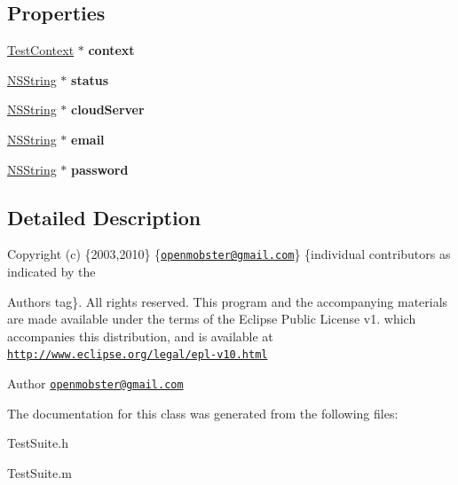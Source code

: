 \subsection*{\-Properties}
\begin{DoxyCompactItemize}
\item 
\hypertarget{interface_test_suite_a1852d1ae3801301dbcdf5324e276474a}{
\hyperlink{interface_test_context}{\-Test\-Context} $\ast$ {\bfseries context}}
\label{interface_test_suite_a1852d1ae3801301dbcdf5324e276474a}

\item 
\hypertarget{interface_test_suite_aa55bc04e8394fa1860e92e098b858c40}{
\hyperlink{class_n_s_string}{\-N\-S\-String} $\ast$ {\bfseries status}}
\label{interface_test_suite_aa55bc04e8394fa1860e92e098b858c40}

\item 
\hypertarget{interface_test_suite_aee65c3c5003d0da11b95cf653cc19756}{
\hyperlink{class_n_s_string}{\-N\-S\-String} $\ast$ {\bfseries cloud\-Server}}
\label{interface_test_suite_aee65c3c5003d0da11b95cf653cc19756}

\item 
\hypertarget{interface_test_suite_aa962f8c847eab597c3b920ccadad864b}{
\hyperlink{class_n_s_string}{\-N\-S\-String} $\ast$ {\bfseries email}}
\label{interface_test_suite_aa962f8c847eab597c3b920ccadad864b}

\item 
\hypertarget{interface_test_suite_a08b3d84247b47890d0de254b43020cfc}{
\hyperlink{class_n_s_string}{\-N\-S\-String} $\ast$ {\bfseries password}}
\label{interface_test_suite_a08b3d84247b47890d0de254b43020cfc}

\end{DoxyCompactItemize}


\subsection{\-Detailed \-Description}
\-Copyright (c) \{2003,2010\} \{\href{mailto:openmobster@gmail.com}{\tt openmobster@gmail.\-com}\} \{individual contributors as indicated by the \begin{DoxyAuthor}{\-Authors}
tag\}. \-All rights reserved. \-This program and the accompanying materials are made available under the terms of the \-Eclipse \-Public \-License v1. which accompanies this distribution, and is available at \href{http://www.eclipse.org/legal/epl-v10.html}{\tt http\-://www.\-eclipse.\-org/legal/epl-\/v10.\-html}
\end{DoxyAuthor}
\begin{DoxyAuthor}{\-Author}
\href{mailto:openmobster@gmail.com}{\tt openmobster@gmail.\-com} 
\end{DoxyAuthor}


\-The documentation for this class was generated from the following files\-:\begin{DoxyCompactItemize}
\item 
\-Test\-Suite.\-h\item 
\-Test\-Suite.\-m\end{DoxyCompactItemize}
